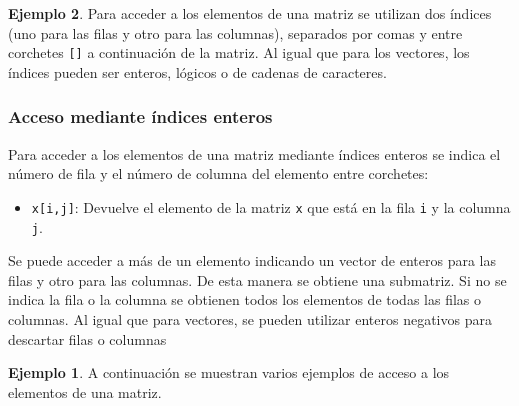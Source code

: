 \documentclass[
]{book}
\providecommand{\tightlist}{%
  \setlength{\itemsep}{0pt}\setlength{\parskip}{0pt}}
\theoremstyle{definition}
\theoremstyle{definition}
\newtheorem{example}{Ejemplo}[chapter]
\theoremstyle{definition}
\theoremstyle{definition}
\theoremstyle{remark}
\begin{document}
\begin{example}
Para acceder a los elementos de una matriz se utilizan dos índices (uno para las filas y otro para las columnas), separados por comas y entre corchetes \texttt{{[}{]}} a continuación de la matriz. Al igual que para los vectores, los índices pueden ser enteros, lógicos o de cadenas de caracteres.

\hypertarget{acceso-mediante-uxedndices-enteros}{%
\subsubsection{Acceso mediante índices enteros}\label{acceso-mediante-uxedndices-enteros}}

Para acceder a los elementos de una matriz mediante índices enteros se indica el número de fila y el número de columna del elemento entre corchetes:

\begin{itemize}
\tightlist
\item
  \texttt{x{[}i,j{]}}: Devuelve el elemento de la matriz \texttt{x} que está en la fila \texttt{i} y la columna \texttt{j}.
\end{itemize}

Se puede acceder a más de un elemento indicando un vector de enteros para las filas y otro para las columnas. De esta manera se obtiene una submatriz. Si no se indica la fila o la columna se obtienen todos los elementos de todas las filas o columnas. Al igual que para vectores, se pueden utilizar enteros negativos para descartar filas o columnas

\begin{example}

A continuación se muestran varios ejemplos de acceso a los elementos de una matriz.


\end{example}
\end{example}
\end{document}
